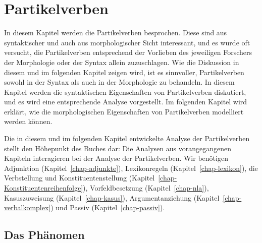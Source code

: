 \newcommand{\anf}{\emph{an$_5$}\xspace}%
\newcommand{\los}{\emph{los}\xspace}


\chapter{Partikelverben}
\label{chap-partikel}

In diesem Kapitel werden die Partikelverben besprochen. Diese sind
aus syntaktischer und auch aus morphologischer Sicht interessant,
und es wurde oft versucht, die Partikelverben entsprechend der Vorlieben
des jeweiligen Forschers der Morphologie oder der Syntax allein zuzuschlagen.
Wie die Diskussion in diesem und im folgenden Kapitel zeigen wird, ist
es sinnvoller, Partikelverben sowohl in der Syntax als auch in der Morphologie
zu behandeln. In diesem Kapitel werden die syntaktischen Eigenschaften
von Partikelverben diskutiert, und es wird eine entsprechende Analyse vorgestellt.
Im folgenden Kapitel wird erklärt, wie die morphologischen Eigenschaften
von Partikelverben modelliert werden können.

Die in diesem und im folgenden Kapitel entwickelte Analyse der Partikelverben stellt
den Höhepunkt des Buches dar: Die Analysen aus vorangegangenen Kapiteln interagieren
bei der Analyse der Partikelverben. Wir benötigen Adjunktion (Kapitel~\ref{chap-adjunkte}),
Lexikonregeln (Kapitel~\ref{chap-lexikon}), die Verbstellung und Konstituentenstellung 
(Kapitel~\ref{chap-Konstituentenreihenfolge}), Vorfeldbesetzung (Kapitel~\ref{chap-nla}),
Kasuszuweisung (Kapitel~\ref{chap-kasus}),
Argumentanziehung (Kapitel~\ref{chap-verbalkomplex}) und Passiv (Kapitel~\ref{chap-passiv}).

\section{Das Phänomen}

